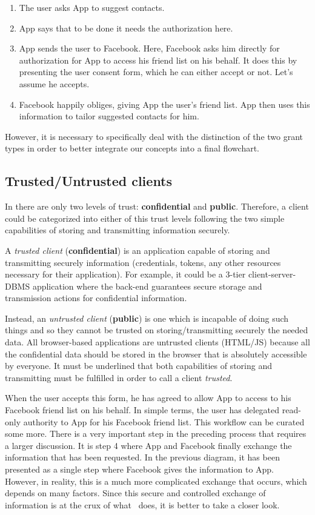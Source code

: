 \begin{enumerate}
    \item The user asks App to suggest contacts.
    \item App says that to be done it needs the authorization here.
    \item App sends the user to Facebook. Here, Facebook asks him directly for authorization for App to access his friend list on his behalf. It does this by presenting the user consent form, which he can either accept or not. Let's assume he accepts.
    \item Facebook happily obliges, giving App the user's friend list. App then uses this information to tailor suggested contacts for him.
\end{enumerate}

However, it is necessary to specifically deal with the distinction of the two grant types in order to better integrate our concepts into a final flowchart.

\subsection{Trusted/Untrusted clients}

In \textit{\oauth} there are only two levels of trust: \textbf{confidential} and \textbf{public}. 
Therefore, a client could be categorized into either of this trust levels following the two simple capabilities of storing and transmitting information securely.

A \textit{trusted client} (\textbf{confidential}) is an application capable of storing and transmitting securely information (credentials, tokens, any other resources necessary for their application).
For example, it could be a 3-tier client-server-DBMS application where the back-end guarantees secure storage and transmission actions for confidential information. 

Instead, an \textit{untrusted client} (\textbf{public}) is one which is incapable of doing such things and so they cannot be trusted on storing/transmitting securely the needed data. All browser-based applications are untrusted clients (HTML/JS) because all the confidential data should be stored in the browser that is absolutely accessible by everyone.
It must be underlined that both capabilities of storing and transmitting must be fulfilled in order to call a client \textit{trusted}.

When the user accepts this form, he has agreed to allow App to access to his Facebook friend list on his behalf. In simple terms, the user has delegated read-only authority to App for his Facebook friend list.
This workflow can be curated some more. There is a very important step in the
preceding process that requires a larger discussion. It is step 4 where App and
Facebook finally exchange the information that has been requested. In the previous diagram, it has been presented as a single step where Facebook gives the information to App. However, in reality, this is a much more complicated exchange that occurs, which depends on many factors. Since this secure and controlled exchange of information is at the crux of what \oauth\ does, it is better to take a closer look.

